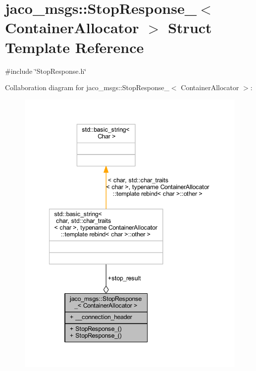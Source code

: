 \hypertarget{structjaco__msgs_1_1StopResponse__}{}\section{jaco\+\_\+msgs\+:\+:Stop\+Response\+\_\+$<$ Container\+Allocator $>$ Struct Template Reference}
\label{structjaco__msgs_1_1StopResponse__}


{\ttfamily \#include \char`\"{}Stop\+Response.\+h\char`\"{}}



Collaboration diagram for jaco\+\_\+msgs\+:\+:Stop\+Response\+\_\+$<$ Container\+Allocator $>$\+:
\nopagebreak
\begin{figure}[H]
\begin{center}
\leavevmode
\includegraphics[width=342pt]{dd/dc8/structjaco__msgs_1_1StopResponse____coll__graph}
\end{center}
\end{figure}

